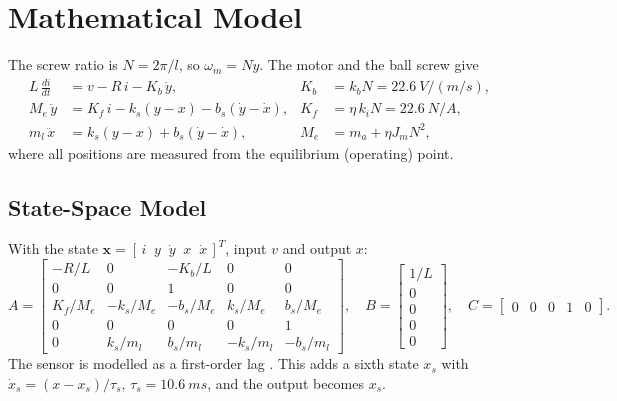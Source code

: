 \section{Mathematical Model}\label{sec:model}

The screw ratio is $N = 2\pi/l$, so $\omega_m = N\dot y$. The motor and the ball screw give
\begin{align}
L\,\frac{di}{dt} &= v - R\,i - K_b\,\dot y, & K_b &= k_b N = \SI{22.6}{V/(m/s)},\\
M_e\,\ddot y &= K_f\, i - k_s (y-x) - b_s(\dot y-\dot x), & K_f &= \eta\, k_i N = \SI{22.6}{N/A},\\
m_l\,\ddot x &= k_s (y-x) + b_s(\dot y-\dot x), & M_e &= m_a + \eta J_m N^2,
\end{align}
where all positions are measured from the equilibrium (operating) point.

\subsection{State-Space Model}
With the state $\mathbf{x} = [\,i\;\; y\;\; \dot y\;\; x\;\; \dot x\,]^T$, input $v$ and output $x$:
\begin{equation}
A=\begin{bmatrix}
-R/L & 0 & -K_b/L & 0 & 0\\
0 & 0 & 1 & 0 & 0\\
K_f/M_e & -k_s/M_e & -b_s/M_e & k_s/M_e & b_s/M_e\\
0&0&0&0&1\\
0 & k_s/m_l & b_s/m_l & -k_s/m_l & -b_s/m_l\end{bmatrix},\quad
B=\begin{bmatrix}1/L\\0\\0\\0\\0\end{bmatrix},\quad
C=\begin{bmatrix}0&0&0&1&0\end{bmatrix}.
\end{equation}
The sensor is modelled as a first-order lag \cite{balluff}. This adds a sixth state $x_s$ with
$\dot x_s = (x-x_s)/\tau_s$, $\tau_s=\SI{10.6}{ms}$, and the output becomes $x_s$.

